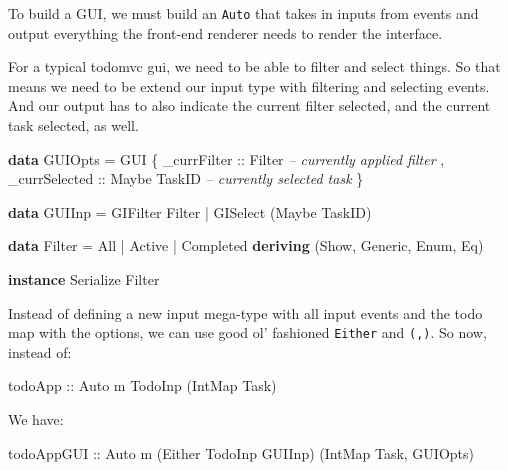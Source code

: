 \documentclass[]{article}
\newenvironment{Shaded}{}{}
\newcommand{\KeywordTok}[1]{\textcolor[rgb]{0.00,0.44,0.13}{\textbf{{#1}}}}
\newcommand{\DataTypeTok}[1]{\textcolor[rgb]{0.56,0.13,0.00}{{#1}}}
\newcommand{\CommentTok}[1]{\textcolor[rgb]{0.38,0.63,0.69}{\textit{{#1}}}}
\newcommand{\OtherTok}[1]{\textcolor[rgb]{0.00,0.44,0.13}{{#1}}}
\newcommand{\FunctionTok}[1]{\textcolor[rgb]{0.02,0.16,0.49}{{#1}}}
\newcommand{\NormalTok}[1]{{#1}}
\begin{document}
To build a GUI, we must build an \texttt{Auto} that takes in inputs from
events and output everything the front-end renderer needs to render the
interface.

For a typical todomvc gui, we need to be able to filter and select
things. So that means we need to be extend our input type with filtering
and selecting events. And our output has to also indicate the current
filter selected, and the current task selected, as well.

\begin{Shaded}
\begin{Highlighting}[]
\KeywordTok{data} \DataTypeTok{GUIOpts} \FunctionTok{=} \DataTypeTok{GUI} \NormalTok{\{ _}\OtherTok{currFilter   ::} \DataTypeTok{Filter}        \CommentTok{-- currently applied filter}
                   \NormalTok{, _}\OtherTok{currSelected ::} \DataTypeTok{Maybe} \DataTypeTok{TaskID}  \CommentTok{-- currently selected task}
                   \NormalTok{\}}

\KeywordTok{data} \DataTypeTok{GUIInp} \FunctionTok{=} \DataTypeTok{GIFilter} \DataTypeTok{Filter}
            \FunctionTok{|} \DataTypeTok{GISelect} \NormalTok{(}\DataTypeTok{Maybe} \DataTypeTok{TaskID}\NormalTok{)}

\KeywordTok{data} \DataTypeTok{Filter} \FunctionTok{=} \DataTypeTok{All} \FunctionTok{|} \DataTypeTok{Active} \FunctionTok{|} \DataTypeTok{Completed}
            \KeywordTok{deriving} \NormalTok{(}\DataTypeTok{Show}\NormalTok{, }\DataTypeTok{Generic}\NormalTok{, }\DataTypeTok{Enum}\NormalTok{, }\DataTypeTok{Eq}\NormalTok{)}

\KeywordTok{instance} \DataTypeTok{Serialize} \DataTypeTok{Filter}
\end{Highlighting}
\end{Shaded}

Instead of defining a new input mega-type with all input events and the
todo map with the options, we can use good ol' fashioned \texttt{Either}
and \texttt{(,)}. So now, instead of:

\begin{Shaded}
\begin{Highlighting}[]
\OtherTok{todoApp ::} \DataTypeTok{Auto} \NormalTok{m }\DataTypeTok{TodoInp} \NormalTok{(}\DataTypeTok{IntMap} \DataTypeTok{Task}\NormalTok{)}
\end{Highlighting}
\end{Shaded}

We have:

\begin{Shaded}
\begin{Highlighting}[]
\OtherTok{todoAppGUI ::} \DataTypeTok{Auto} \NormalTok{m (}\DataTypeTok{Either} \DataTypeTok{TodoInp} \DataTypeTok{GUIInp}\NormalTok{) (}\DataTypeTok{IntMap} \DataTypeTok{Task}\NormalTok{, }\DataTypeTok{GUIOpts}\NormalTok{)}
\end{Highlighting}
\end{Shaded}
\end{document}
